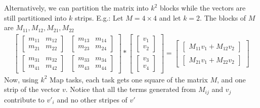 Alternatively, we can partition the matrix into $k^2$ blocks while the vectors are still partitioned into $k$ strips. E.g.: Let $M = 4 \times 4$ and let $k=2$. The blocks of $M$ are $M_{11}, M_{12}, M_{21}, M_{22}$
    \begin{align*}
        \begin{bmatrix}
            \begin{bmatrix}
                m_{11} & m_{12} \\
                m_{21} & m_{22}
            \end{bmatrix}
            &
            \begin{bmatrix}
                m_{13} & m_{14} \\
                m_{23} & m_{24}
            \end{bmatrix}
            \\
            \begin{bmatrix}
                m_{31} & m_{32} \\
                m_{41} & m_{42}
            \end{bmatrix}
            & 
            \begin{bmatrix}
                m_{33} & m_{34} \\
                m_{43} & m_{44}
            \end{bmatrix}             
        \end{bmatrix}
        * 
        \begin{bmatrix}
            \begin{bmatrix}
                    v_1 \\ v_2
            \end{bmatrix}
            \\
            \begin{bmatrix}
                    v_3 \\ v_4
            \end{bmatrix}
        \end{bmatrix}
         = 
         \begin{bmatrix}
             \begin{bmatrix}
                M_{11} v_1 + M_{12}v_2       
             \end{bmatrix}
             \\
            \begin{bmatrix}
                M_{21} v_1 + M_{22}v_2       
             \end{bmatrix}
         \end{bmatrix}
    \end{align*}
Now, using $k^2$ Map tasks, each task gets one square of the matrix $M$, and one strip of the vector $v$. Notice that all the terms generated from $M_{ij}$ and $v_j$ contribute to $v'_i$ and no other stripes of $v'$ 

